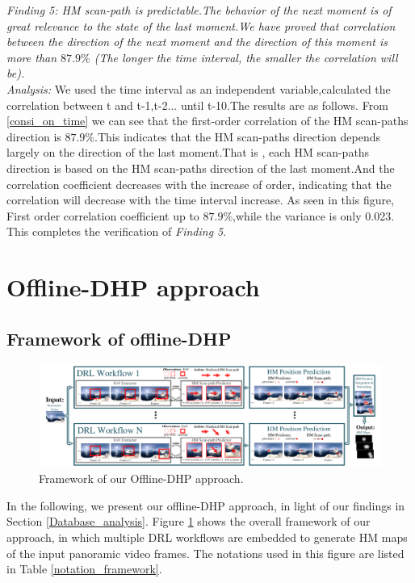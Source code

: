 \documentclass[10pt,journal,compsoc]{IEEEtran}
\begin{document}
\emph{Finding 5: HM scan-path is predictable.The behavior of the next moment is of great relevance to the state of the last moment.We have proved that correlation between the direction of the next moment and the direction of this moment is more than $87.9\%$ (The longer the time interval, the smaller the correlation will be). }
\\ \textit{Analysis:} We used the time interval as an independent variable,calculated the correlation between t and t-1,t-2... until t-10.The results are as follows.
From \ref{consi_on_time} we can see that the first-order correlation of the HM scan-paths direction is $87.9\%$.This indicates that the HM scan-paths direction depends largely on the direction of the last moment.That is , each HM scan-paths direction is based on the HM scan-paths direction of the last moment.And the correlation coefficient decreases with the increase of order, indicating that the correlation will decrease with the time interval increase.
As seen in this figure, First order correlation coefficient up to $87.9\%$,while the variance is only 0.023.
This completes the verification of \textit{Finding 5}.

\section{Offline-DHP approach}

\subsection{Framework of offline-DHP}
\label{framework}

\begin{figure}
	\begin{center}
		\centerline{\includegraphics[width=2\columnwidth]{figures/dhp_approach/main_framework}}%
		\caption{Framework of our Offline-DHP approach.}
		\label{main-framework}
	\end{center}
\end{figure}

In the following, we present our offline-DHP approach, in light of our findings in Section \ref{Database_analysis}.
Figure \ref{main-framework} shows the overall framework of our approach, in which multiple DRL workflows are embedded to generate HM maps of the input panoramic video frames. The notations used in this figure are listed in Table \ref{notation_framework}.
\end{document}
